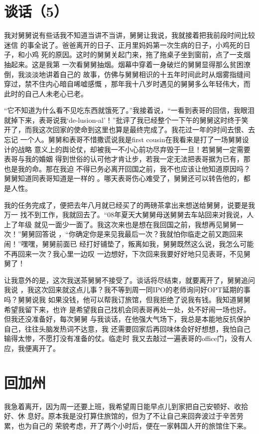 \documentclass[12pt]{book}
\begin{document}
\section{谈话（5）}
\label{sec-9-77}

我对舅舅说有些话我不知道当讲不当讲，舅舅让我说，我就接着把我前段时间比较迷信
的事全说了。爸爸离开的日子、正月里妈妈第一次生病的日子，小鸡死的日子，和小鸡
死的原因。这时的舅舅关起门来，拖了拖桌子坐到窗前，点了一支烟抽起来。这是我第
一次看舅舅抽烟。烟幕中穿着一身破烂的舅舅显得那么贫困潦倒，我淡淡地讲着自己的
故事，仿佛与舅舅相识的十五年时间此时从烟雾指缝间穿过，禁不住内心暗自唏嘘感慨
，那年我十八岁时遇见的舅舅多么年轻伟大，而此时的自己人未老心已老。

“它不知道为什么看不见吃东西就饿死了。”我接着说，“一看到表哥的回信，我眼泪
就掉下来，表哥说我‘de-lusion-al’！”批评了我已经整个一下午的舅舅这时终于笑
开了，而我这次回家的使命到这里也算是最终完成了。我花过一年的时间去恨、去忘记
一个人。舅舅和表哥不惜撒谎说我是first cousin在我看来是打了一场舅舅设计的战略
意义上的舆论仗，却被我一不小心前功尽弃毁于一旦！若舅舅一定需要表哥与我的婚姻
得到世俗的认可他才肯让步，若我一定无法把表哥据为已有，那也是我的命。那在我迫
不得已务必离开回国之前，我不也应该让他知道原因吗？舅舅知道同表哥知道是一样的
。哪天表哥伤心难受了，舅舅还可以转告他的，都是人性。

我的任务完成了，便把去年八月就已经买了的两磅茶拿出来想送给舅舅，说要是我万一
找不到工作，我就回去了。“08年夏天大舅舅母送舅舅去车站回来对我说，人上了年级
就见一面少一面了。我这次来也是想在我回国之前，我想再见舅舅一次！”舅舅回答说
，“你确定你是来见我最后一次？我就怕你临走之前又跑回来闹！”嘿嘿，舅舅前面已
经打好铺垫了，叛离如我，舅舅既然这么说，我怎么可能不再回来一次？我心里一边叹
一边想好，下次回来我要好好地只见表哥，不见舅舅了！

让我意外的是，这次我送茶舅舅不接受了。谈话将尽结束，就要离开了，舅舅追问我说
，我这次回来就这点儿事？我不等到周一同IPO的老师询问好OPT延期的事吗？舅舅说我
如果没钱，他可以帮我订旅馆，但我拒绝了说我有钱。我知道舅舅希望我留下来，也许
是希望我自己找机会同表哥再处一处，处不好闹一场也好。但我还没准备好，每次舅舅
与我谈话，在他强大气场下，我总是本能地反抗保护自己，往往头脑发热词不达意，我
还需要回家后再回味体会好好想想，我怕自己输得太惨，不愿打没有准备的仗。临走时
我又去敲过一遍表哥的office门，没有人应，我便离开了。
\section{回加州}
\label{sec-9-78}

我急着离开，因为周一还要上班，我希望周日能早点儿到家把自己安顿好、收拾好、休
息好。原本我是没打算住旅馆的，但为了不让自己来回奔波过于辛苦劳累，也为自己的
荣貌考虑，开了两个小时后，便在一家韩国人开的旅馆住下来。
\end{document}
